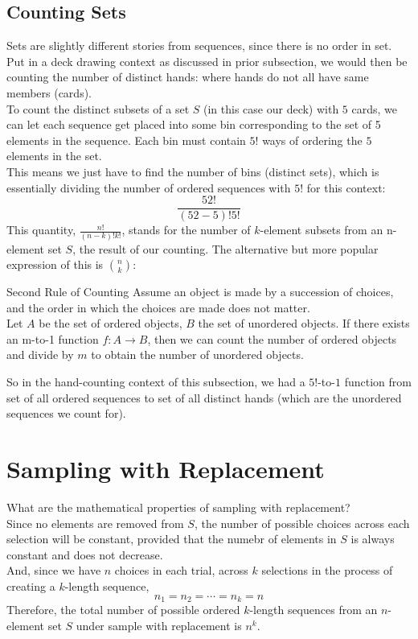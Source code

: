 \subsection{Counting Sets}
Sets are slightly different stories from sequences, since there is no order in set. \\
Put in a deck drawing context as discussed in prior subsection, we would then be counting the number of distinct hands: where hands do not all have same members (cards). \\
To count the distinct subsets of a set $S$ (in this case our deck) with $5$ cards, we can let each sequence get placed into some bin corresponding to the set of 5 elements in the sequence. Each bin must contain $5!$ ways of ordering the $5$ elements in the set. \\
This means we just have to find the number of bins (distinct sets), which is essentially dividing the number of ordered sequences with $5!$ for this context:
\[\frac{52!}{(52 - 5)!5!}\]
This quantity, $\frac{n!}{(n - k)!k!}$, stands for the number of $k$-element subsets from an n-element set $S$, the result of our counting. The alternative but more popular expression of this is $\binom{n}{k}$:
\begin{ln-theorem}{Second Rule of Counting}{}
    Assume an object is made by a succession of choices, and the order in which the choices are made does not matter. \\
    Let $A$ be the set of ordered objects, $B$ the set of unordered objects. If there exists an m-to-1 function $f: A \rightarrow B$, then we can count the number of ordered objects and divide by $m$ to obtain the number of unordered objects.
\end{ln-theorem}
So in the hand-counting context of this subsection, we had a $5!$-to-$1$ function from set of all ordered sequences to set of all distinct hands (which are the unordered sequences we count for).

\section{Sampling with Replacement}
What are the mathematical properties of sampling with replacement? \\
Since no elements are removed from $S$, the number of possible choices across each selection will be constant, provided that the numebr of elements in $S$ is always constant and does not decrease. \\
And, since we have $n$ choices in each trial, across $k$ selections in the process of creating a $k$-length sequence, 
\[n_1 = n_2 = \cdots = n_k = n\]
Therefore, the total number of possible ordered $k$-length sequences from an $n$-element set $S$ under sample with replacement is $n^k$.

